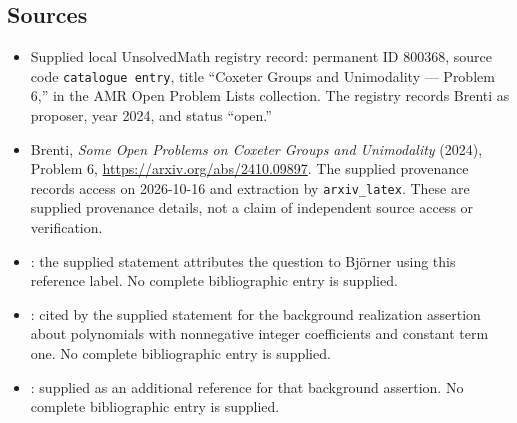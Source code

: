 \documentclass[11pt]{article}
\begin{document}
\subsection{Sources}
\begin{itemize}
\item Supplied local UnsolvedMath registry record: permanent ID \(800368\), source code \texttt{catalogue entry}, title ``Coxeter Groups and Unimodality --- Problem 6,'' in the AMR Open Problem Lists collection. The registry records Brenti as proposer, year 2024, and status ``open.''
\item Brenti, \emph{Some Open Problems on Coxeter Groups and Unimodality} (2024), Problem 6, \url{https://arxiv.org/abs/2410.09897}. The supplied provenance records access on 2026-10-16 and extraction by \texttt{arxiv\_latex}. These are supplied provenance details, not a claim of independent source access or verification.
\item [BjoPC]: the supplied statement attributes the question to Bj\"{o}rner using this reference label. No complete bibliographic entry is supplied.
\item [Polo]: cited by the supplied statement for the background realization assertion about polynomials with nonnegative integer coefficients and constant term one. No complete bibliographic entry is supplied.
\item [CasRep]: supplied as an additional reference for that background assertion. No complete bibliographic entry is supplied.
\end{itemize}
\end{document}
